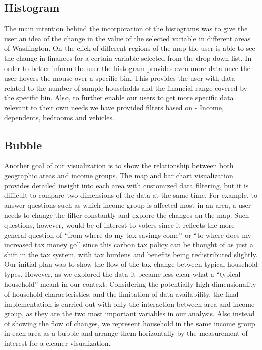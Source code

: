 \documentclass{sigchi}
\begin{document}
\subsection{Histogram}
The main intention behind the incorporation of the histograms was to give the user an idea of the change in the value of the selected variable in different areas of Washington. On the click of different regions of the map the user is able to see the change in finances for a certain variable selected from the drop down list.
In order to better inform the user the histogram provides even more data once the user hovers the mouse over a specific bin. This provides the user with data related to the number of sample households and the financial range covered by the specific bin.
Also, to further enable our users to get more specific data relevant to their own needs we have provided filters based on - Income, dependents, bedrooms and vehicles.

\subsection{Bubble}
Another goal of our visualization is to show the relationship between both geographic areas and income groups. The map and bar chart visualization provides detailed insight into each area with customized data filtering, but it is difficult to compare two dimensions of the data at the same time. For example, to answer questions such as which income group is affected most in an area, a user needs to change the filter constantly and explore the changes on the map. Such questions, however, would be of interest to voters since it reflects the more general question of ``from where do my tax savings come’’ or ``to where does my increased tax money go’’ since this carbon tax policy can be thought of as just a shift in the tax system, with tax burdens and benefits being redistributed slightly. Our initial plan was to show the flow of the tax change between typical household types.  However, as we explored the data it became less clear what a “typical household” meant in our context. Considering the potentially high dimensionality of household characteristics, and the limitation of data availability, the final implementation is carried out with only the interaction between area and income group, as they are the two most important variables in our analysis.  Also instead of showing the flow of changes, we represent household in the same income group in each area as a bubble and arrange them horizontally by the measurement of interest for a cleaner visualization.
\end{document}

